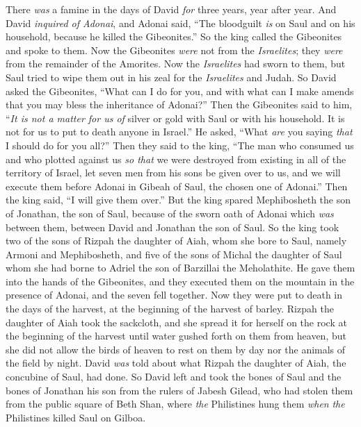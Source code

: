 \begin{biblechapter} %
 There \textit{was} a famine in the days of David \textit{for} three years, year after year. And David \textit{inquired of Adonai}, and Adonai said, “The bloodguilt \textit{is} on Saul and on his household, because he killed the Gibeonites.”
\verse So the king called the Gibeonites and spoke to them. Now the Gibeonites \textit{were} not from the \textit{Israelites}; they \textit{were} from the remainder of the Amorites. Now the \textit{Israelites} had sworn to them, but Saul tried to wipe them out in his zeal for the \textit{Israelites} and Judah.
\verse So David asked the Gibeonites, “What can I do for you, and with what can I make amends that you may bless the inheritance of Adonai?”
\verse Then the Gibeonites said to him, “\textit{It is not a matter for us of} silver or gold with Saul or with his household. It is not for us to put to death anyone in Israel.” He asked, “What \textit{are} you saying \textit{that} I should do for you all?”
\verse Then they said to the king, “The man who consumed us and who plotted against us \textit{so that} we were destroyed from existing in all of the territory of Israel,
\verse let seven men from his sons be given over to us, and we will execute them before Adonai in Gibeah of Saul, the chosen one of Adonai.” Then the king said, “I will give them over.”
\verse But the king spared Mephibosheth the son of Jonathan, the son of Saul, because of the sworn oath of Adonai which \textit{was} between them, between David and Jonathan the son of Saul.
\verse So the king took two of the sons of Rizpah the daughter of Aiah, whom she bore to Saul, namely Armoni and Mephibosheth, and five of the sons of Michal the daughter of Saul whom she had borne to Adriel the son of Barzillai the Meholathite.
\verse He gave them into the hands of the Gibeonites, and they executed them on the mountain in the presence of Adonai, and the seven fell together. Now they were put to death in the days of the harvest, at the beginning of the harvest of barley.
\verse Rizpah the daughter of Aiah took the sackcloth, and she spread it for herself on the rock at the beginning of the harvest until water gushed forth on them from heaven, but she did not allow the birds of heaven to rest on them by day nor the animals of the field by night.
\verse David \textit{was} told about what Rizpah the daughter of Aiah, the concubine of Saul, had done.
\verse So David left and took the bones of Saul and the bones of Jonathan his son from the rulers of Jabesh Gilead, who had stolen them from the public square of Beth Shan, where \textit{the} Philistines hung them \textit{when} \textit{the} Philistines killed Saul on Gilboa.

\end{biblechapter}
